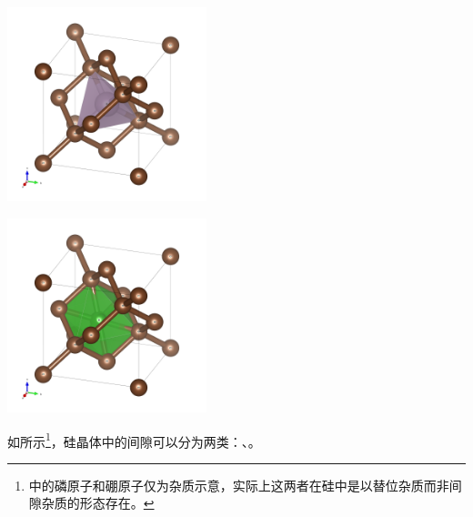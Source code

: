 \begin{Figure}[硅的两类间隙]
    \begin{FigureSub}[四面体间隙]
        \includegraphics[width=5.8cm]{image/Diamond1.png}
    \end{FigureSub}
    \hspace{0.5cm}
    \begin{FigureSub}[六角形间隙]
        \includegraphics[width=5.8cm]{image/Diamond2.png}
    \end{FigureSub}
\end{Figure}

如所示\footnote{中的磷原子和硼原子仅为杂质示意，实际上这两者在硅中是以替位杂质而非间隙杂质的形态存在。}，硅晶体中的间隙可以分为两类：、。\goodbreak

